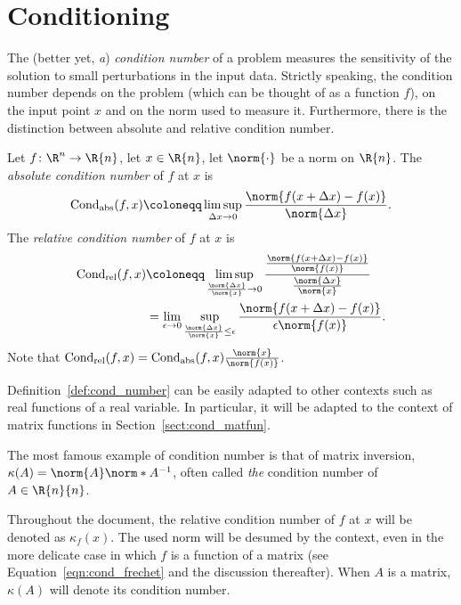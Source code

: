 \section{Conditioning}\label{sect:conditioning_general}
The (better yet, \emph{a}) \emph{condition number} of a problem measures the sensitivity of the solution to small perturbations in the input data. Strictly speaking, the condition number depends on the problem (which can be thought of as a function $f$), on the input point $x$ and on the norm used to measure it. Furthermore, there is the distinction between absolute and relative condition number.

\begin{definizione}\label{def:cond_number}
	Let $f\colon\R^{n}\to\R{n}$, let $x\in\R{n}$, let $\norm{\cdot}$ be a norm on $\R{n}$. The \emph{absolute condition number} of $f$ at $x$ is 
	\begin{equation*}\label{eqn:abs_cond_def}
		\operatorname{Cond}_{\text{abs}}(f,x)\coloneqq\limsup_{\Delta{x}\to0}\frac{\norm{f(x+\Delta{x})-f(x)}}{\norm{\Delta{x}}}.
	\end{equation*}
	The \emph{relative condition number} of $f$ at $x$ is 
	\begin{align*}\label{eqn:rel_cond_def}
		\operatorname{Cond}_{\text{rel}}(f,x)&\coloneqq\limsup_{\frac{\norm{\Delta{x}}}{\norm{x}}\to0}\frac{\frac{\norm{f(x+\Delta{x})-f(x)}}{\norm{f(x)}}}{\frac{\norm{\Delta{x}}}{\norm{x}}}\\
		 & = \lim_{\epsilon\to0}\sup_{\frac{\norm{\Delta{x}}}{\norm{x}}\le\epsilon}\frac{\norm{f(x+\Delta{x})-f(x)}}{\epsilon\norm{f(x)}}.
	\end{align*}
	Note that $\operatorname{Cond}_{\text{rel}}(f,x)=\operatorname{Cond}_{\text{abs}}(f,x)\frac{\norm{x}}{\norm{f(x)}}$.
\end{definizione}
Definition~\ref{def:cond_number} can be easily adapted to other contexts such as real functions of a real variable. In particular, it will be adapted to the context of matrix functions in Section~\ref{sect:cond_matfun}.

The most famous example of condition number is that of matrix inversion, $\kappa(A)=\norm{A}\norm*{A^{-1}}$, often called \emph{the} condition number of $A\in\R{n}{n}$.

\begin{notazione}\label{notaz:kappa_f}
	Throughout the document, the relative condition number of $f$ at $x$ will be denoted as $\kappa_{f}(x)$. The used norm will be desumed by the context, even in the more delicate case in which $f$ is a function of a matrix (see Equation~\eqref{eqn:cond_frechet} and the discussion thereafter). When $A$ is a matrix, $\kappa(A)$ will denote its condition number.
\end{notazione}

